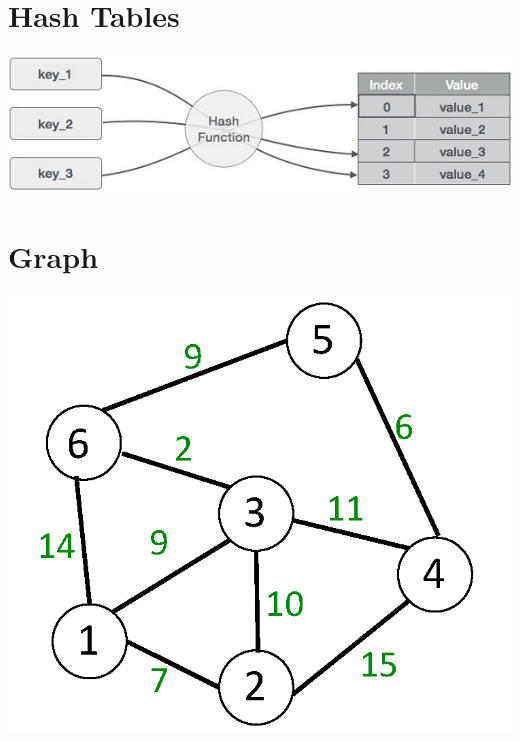 \documentclass[11pt]{article}
\begin{document}
\section{Hash Tables}
\begin{center}
    \includegraphics[width=300 px]{img/hash}  \\
\end{center}
\section{Graph}
\begin{center}
    \includegraphics[width=200 px]{img/graph}  \\
\end{center}
\end{document}
